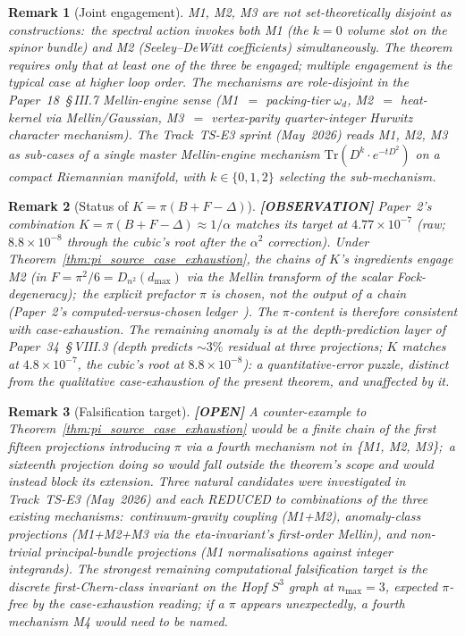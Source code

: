 \documentclass[11pt]{article}
\newtheorem{remark}{Remark}
\begin{document}
\begin{remark}[Joint engagement]
M1, M2, M3 are not set-theoretically disjoint as constructions:\ the
spectral action invokes both M1 (the $k = 0$ volume slot on the spinor
bundle) and M2 (Seeley--DeWitt coefficients) simultaneously.  The theorem requires
only that \emph{at least one} of the three be engaged; multiple
engagement is the typical case at higher loop order.  The mechanisms
are role-disjoint in the Paper~18~\S\,III.7 Mellin-engine sense
(M1~$=$ packing-tier $\omega_d$, M2~$=$ heat-kernel via Mellin/Gaussian,
M3~$=$ vertex-parity quarter-integer Hurwitz character mechanism).
The Track~TS-E3 sprint (May~2026) reads M1, M2, M3 as sub-cases of
a single master Mellin-engine mechanism $\mathrm{Tr}(D^k \cdot e^{-tD^2})$ on a compact Riemannian
manifold, with $k \in \{0, 1, 2\}$ selecting the sub-mechanism.
\end{remark}

\begin{remark}[Status of $K = \pi(B + F - \Delta)$]
\label{rem:K_under_theorem}
\textbf{[OBSERVATION]} Paper~2's combination $K = \pi(B+F-\Delta) \approx 1/\alpha$ matches
its target at $4.77\times10^{-7}$ (raw;\ $8.8 \times 10^{-8}$ through the cubic's root after the $\alpha^2$ correction).  Under
Theorem~\ref{thm:pi_source_case_exhaustion}, the chains of $K$'s
ingredients engage M2
(in $F = \pi^2/6 = D_{n^2}(d_{\max})$ via the Mellin transform of
the scalar Fock-degeneracy);\ the explicit prefactor $\pi$ is chosen,
not the output of a chain (Paper~2's computed-versus-chosen
ledger~\cite{paper2}).  The $\pi$-content is therefore consistent
with case-exhaustion.  The remaining anomaly is at the
\emph{depth-prediction} layer of Paper~34~\S\,VIII.3 (depth predicts
$\sim 3\%$ residual at three projections; $K$ matches at
$4.8\times10^{-7}$, the cubic's root at $8.8\times10^{-8}$): a quantitative-error puzzle, distinct from the
qualitative case-exhaustion of the present theorem, and
unaffected by it.
\end{remark}

\begin{remark}[Falsification target]
\textbf{[OPEN]} A counter-example to Theorem~\ref{thm:pi_source_case_exhaustion}
would be a finite chain of the first fifteen projections introducing
$\pi$ via a fourth mechanism not in \{M1, M2, M3\};\ a sixteenth
projection doing so would fall outside the theorem's scope and would
instead block its extension.  Three natural candidates were investigated in
Track~TS-E3 (May~2026) and each REDUCED to combinations of the
three existing mechanisms:\ continuum-gravity coupling (M1+M2),
anomaly-class projections (M1+M2+M3 via the eta-invariant's
first-order Mellin), and non-trivial principal-bundle projections
(M1 normalisations against integer integrands).  The strongest
remaining computational falsification target is the discrete
first-Chern-class invariant on the Hopf $S^3$ graph at $n_{\max}=3$,
expected $\pi$-free by the case-exhaustion reading; if a $\pi$ appears
unexpectedly, a fourth mechanism M4 would need to be named.
\end{remark}
\end{document}

